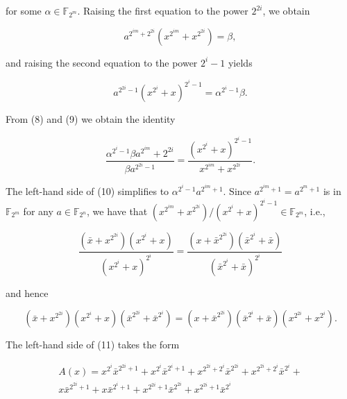 \documentclass[10pt]{article}
\begin{document}
for some $\alpha \in \mathbb{F}_{2^{m}}$. Raising the first equation to the power $2^{2 i}$, we obtain


\begin{equation*}
a^{2^{i m}+2^{2 i}}\left(x^{2^{i m}}+x^{2^{2 i}}\right)=\beta, \tag{8}
\end{equation*}


and raising the second equation to the power $2^{i}-1$ yields


\begin{equation*}
a^{2^{2 i}-1}\left(x^{2^{i}}+x\right)^{2^{i}-1}=\alpha^{2^{i}-1} \beta . \tag{9}
\end{equation*}


From (8) and (9) we obtain the identity


\begin{equation*}
\frac{\alpha^{2^{i}-1} \beta a^{2^{i m}}+2^{2 i}}{\beta a^{2^{2 i}-1}}=\frac{\left(x^{2^{i}}+x\right)^{2^{i}-1}}{x^{2^{i m}}+x^{2^{2 i}}} . \tag{10}
\end{equation*}


The left-hand side of (10) simplifies to $\alpha^{2^{i}-1} a^{2^{i m}+1}$. Since $a^{2^{i m}+1}=a^{2^{m}+1}$ is in $\mathbb{F}_{2^{m}}$ for any $a \in \mathbb{F}_{2^{n}}$, we have that $\left(x^{2^{i m}}+x^{2^{2 i}}\right) /\left(x^{2^{i}}+x\right)^{2^{i}-1} \in \mathbb{F}_{2^{m}}$, i.e.,

$$
\frac{\left(\bar{x}+x^{2^{2 i}}\right)\left(x^{2^{i}}+x\right)}{\left(x^{2^{i}}+x\right)^{2^{i}}}=\frac{\left(x+\bar{x}^{2^{2 i}}\right)\left(\bar{x}^{2^{i}}+\bar{x}\right)}{\left(\bar{x}^{2^{i}}+\bar{x}\right)^{2^{i}}}
$$

and hence


\begin{equation*}
\left(\bar{x}+x^{2^{2 i}}\right)\left(x^{2^{i}}+x\right)\left(\bar{x}^{2^{2 i}}+\bar{x}^{2^{i}}\right)=\left(x+\bar{x}^{2^{2 i}}\right)\left(\bar{x}^{2^{i}}+\bar{x}\right)\left(x^{2^{2 i}}+x^{2^{i}}\right) . \tag{11}
\end{equation*}


The left-hand side of (11) takes the form

$$
\begin{gathered}
A(x)=x^{2^{i}} \bar{x}^{2^{2 i}+1}+x^{2^{i}} \bar{x}^{2^{i}+1}+x^{2^{2 i}+2^{i}} \bar{x}^{2^{2 i}}+x^{2^{2 i}+2^{i}} \bar{x}^{2^{i}}+ \\
x \bar{x}^{2^{2 i}+1}+x \bar{x}^{2^{i}+1}+x^{2^{2 i}+1} \bar{x}^{2^{2 i}}+x^{2^{2 i}+1} \bar{x}^{2^{i}}
\end{gathered}
$$
\end{document}
